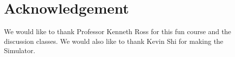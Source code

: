 \section{Acknowledgement}
We would like to thank Professor Kenneth Ross for this fun course and the discussion classes. We would also like to thank Kevin Shi for making the Simulator.